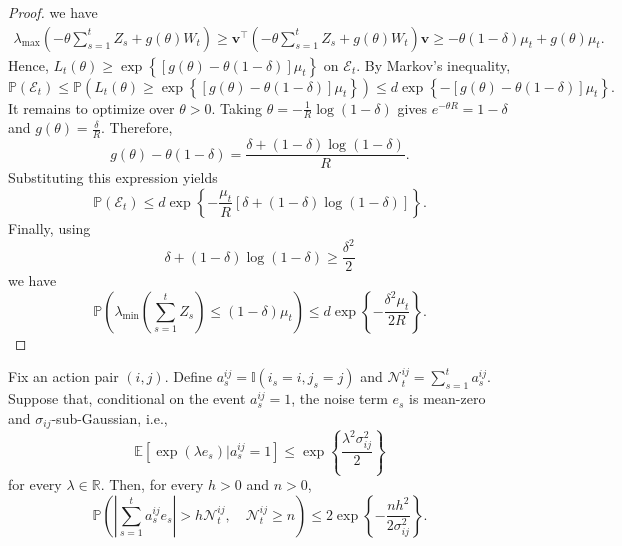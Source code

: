 \documentclass[12pt]{article}
\begin{document}
\begin{proof}
we have
\begin{align*}
\lambda_{\max}
\left(
-\theta \sum_{s=1}^t Z_s
+ g(\theta)W_t
\right)
\ge
\bm v^\top
\left(
-\theta \sum_{s=1}^t Z_s
+ g(\theta)W_t
\right)
\bm v
\ge
-\theta(1-\delta)\mu_t
+ g(\theta)\mu_t.
\end{align*}
Hence, $L_t(\theta) \ge \exp\left\{ \left[ g(\theta) - \theta(1-\delta) \right] \mu_t \right\}$ on $\mathcal E_t$. By Markov's inequality,
\[
\mathbb P(\mathcal E_t)
\le
\mathbb P(L_t(\theta) \ge \exp\left\{ \left[ g(\theta) - \theta(1-\delta) \right] \mu_t \right\})
\le d \exp\left\{
- \left[
g(\theta)
- \theta(1-\delta)
\right]
\mu_t
\right\}.
\]
It remains to optimize over $\theta>0$. Taking $\theta = -\frac{1}{R} \log(1-\delta)$
gives $e^{-\theta R} = 1-\delta$ and $g(\theta) = \frac{\delta}{R}$.
Therefore,
\[
g(\theta) - \theta(1-\delta)
=
\frac{\delta + (1-\delta)\log(1-\delta)}{R}.
\]
Substituting this expression yields
\[
\mathbb P(\mathcal E_t)
\le
d \exp\left\{ -
\frac{\mu_t}{R}
\left[\delta + (1-\delta)\log(1-\delta)\right]
\right\}.
\]
Finally, using
\[
\delta
+
(1-\delta)\log(1-\delta)
\ge
\frac{\delta^2}{2}
\]
we have
\[
\mathbb P\left(
\lambda_{\min}
\left(
\sum_{s=1}^t Z_s
\right)
\le
(1-\delta)\mu_t
\right)
\le
d \exp\left\{
- \frac{\delta^2\mu_t}{2R}
\right\}.
\]
\end{proof}


\begin{lemma}
\label{lem:adaptive-subgaussian}
Fix an action pair $(i,j)$. Define $a_s^{ij} = \mathbb I(i_s=i,j_s=j)$ and $\mathcal N_t^{ij}=\sum_{s=1}^t a_s^{ij}$.
Suppose that, conditional on the event $a_s^{ij}=1$, the noise term $e_s$ is mean-zero and $\sigma_{ij}$-sub-Gaussian, i.e.,
\[
\mathbb E
\left[
\exp(\lambda e_s)|
a_s^{ij}=1
\right]
\le
\exp\left\{
\frac{\lambda^2\sigma_{ij}^2}{2}
\right\}
\]
for every $\lambda\in\mathbb R$. Then, for every $h>0$ and $n>0$,
\[
\mathbb P\left(
\left|
\sum_{s=1}^t a_s^{ij} e_s
\right|
>
h\mathcal N_t^{ij},
\quad
\mathcal N_t^{ij}\ge n
\right)
\le
2
\exp\left\{
-\frac{nh^2}{2\sigma_{ij}^2}
\right\}.
\]
\end{lemma}
\end{document}
